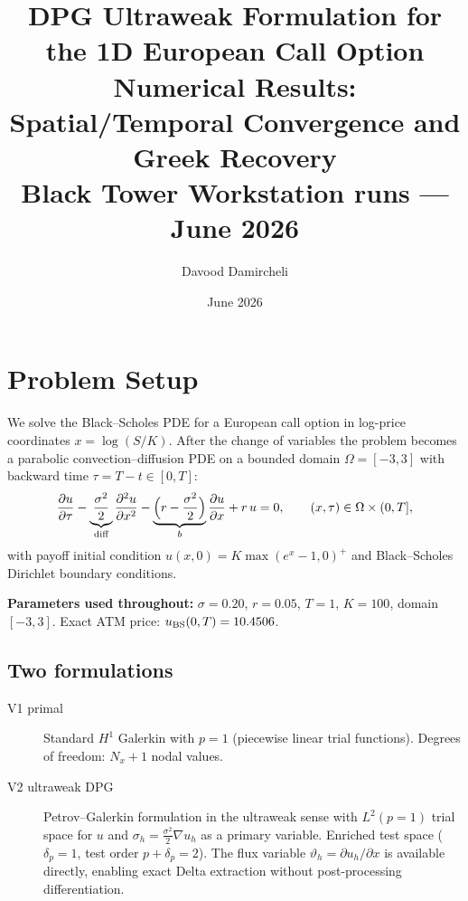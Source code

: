 \documentclass[11pt,a4paper]{article}
\title{\textbf{DPG Ultraweak Formulation for the 1D European Call Option}\\[4pt]
       \large Numerical Results: Spatial/Temporal Convergence and Greek Recovery\\[2pt]
       \normalsize Black Tower Workstation runs --- June 2026}
\author{Davood Damircheli}
\date{June 2026}
\begin{document}
\maketitle
\tableofcontents
\bigskip

\section{Problem Setup}

We solve the Black--Scholes PDE for a European call option in log-price
coordinates $x = \log(S/K)$.  After the change of variables the problem
becomes a parabolic convection--diffusion PDE on a bounded domain
$\Omega = [-3,3]$ with backward time $\tau = T - t \in [0,T]$:
\[
  \frac{\partial u}{\partial \tau}
  - \underbrace{\frac{\sigma^2}{2}}_{\text{diff}} \frac{\partial^2 u}{\partial x^2}
  - \underbrace{\Bigl(r - \frac{\sigma^2}{2}\Bigr)}_{b} \frac{\partial u}{\partial x}
  + r\,u = 0,
  \qquad (x,\tau)\in\Omega\times(0,T],
\]
with payoff initial condition $u(x,0) = K\max(e^x-1,0)^+$ and
Black--Scholes Dirichlet boundary conditions.

\textbf{Parameters used throughout:}
$\sigma = 0.20$, $r = 0.05$, $T = 1$, $K = 100$, domain $[-3,3]$.
Exact ATM price: $u_{\rm BS}(0,T) = 10.4506$.

\subsection*{Two formulations}

\begin{description}
  \item[V1 primal] Standard $H^1$ Galerkin with $p=1$ (piecewise linear
    trial functions). Degrees of freedom: $N_x + 1$ nodal values.

  \item[V2 ultraweak DPG] Petrov--Galerkin formulation in the ultraweak
    sense with $L^2(p{=}1)$ trial space for $u$ and $\sigma_h = \frac{\sigma^2}{2}\nabla u_h$
    as a primary variable. Enriched test space ($\delta_p = 1$, test
    order $p+\delta_p = 2$). The flux variable $\vartheta_h = \partial u_h/\partial x$
    is available directly, enabling exact Delta extraction without
    post-processing differentiation.
\end{description}

\end{document}
